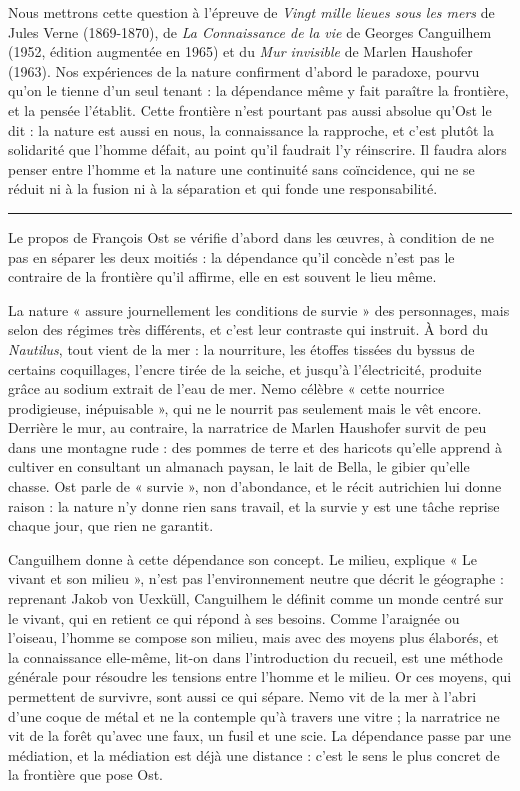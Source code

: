 \documentclass[11pt,a4paper]{article}
\begin{document}
Nous mettrons cette question à l'épreuve de \emph{Vingt mille lieues sous les mers} de Jules Verne (1869-1870), de \emph{La Connaissance de la vie} de Georges Canguilhem (1952, édition augmentée en 1965) et du \emph{Mur invisible} de Marlen Haushofer (1963). Nos expériences de la nature confirment d'abord le paradoxe, pourvu qu'on le tienne d'un seul tenant : la dépendance même y fait paraître la frontière, et la pensée l'établit. Cette frontière n'est pourtant pas aussi absolue qu'Ost le dit : la nature est aussi en nous, la connaissance la rapproche, et c'est plutôt la solidarité que l'homme défait, au point qu'il faudrait l'y réinscrire. Il faudra alors penser entre l'homme et la nature une continuité sans coïncidence, qui ne se réduit ni à la fusion ni à la séparation et qui fonde une responsabilité.

\begin{center}\rule{0.5\linewidth}{0.5pt}\end{center}

Le propos de François Ost se vérifie d'abord dans les œuvres, à condition de ne pas en séparer les deux moitiés : la dépendance qu'il concède n'est pas le contraire de la frontière qu'il affirme, elle en est souvent le lieu même.

La nature « assure journellement les conditions de survie » des personnages, mais selon des régimes très différents, et c'est leur contraste qui instruit. À bord du \emph{Nautilus}, tout vient de la mer : la nourriture, les étoffes tissées du byssus de certains coquillages, l'encre tirée de la seiche, et jusqu'à l'électricité, produite grâce au sodium extrait de l'eau de mer. Nemo célèbre « cette nourrice prodigieuse, inépuisable », qui ne le nourrit pas seulement mais le vêt encore. Derrière le mur, au contraire, la narratrice de Marlen Haushofer survit de peu dans une montagne rude : des pommes de terre et des haricots qu'elle apprend à cultiver en consultant un almanach paysan, le lait de Bella, le gibier qu'elle chasse. Ost parle de « survie », non d'abondance, et le récit autrichien lui donne raison : la nature n'y donne rien sans travail, et la survie y est une tâche reprise chaque jour, que rien ne garantit.

Canguilhem donne à cette dépendance son concept. Le milieu, explique « Le vivant et son milieu », n'est pas l'environnement neutre que décrit le géographe : reprenant Jakob von Uexküll, Canguilhem le définit comme un monde centré sur le vivant, qui en retient ce qui répond à ses besoins. Comme l'araignée ou l'oiseau, l'homme se compose son milieu, mais avec des moyens plus élaborés, et la connaissance elle-même, lit-on dans l'introduction du recueil, est une méthode générale pour résoudre les tensions entre l'homme et le milieu. Or ces moyens, qui permettent de survivre, sont aussi ce qui sépare. Nemo vit de la mer à l'abri d'une coque de métal et ne la contemple qu'à travers une vitre ; la narratrice ne vit de la forêt qu'avec une faux, un fusil et une scie. La dépendance passe par une médiation, et la médiation est déjà une distance : c'est le sens le plus concret de la frontière que pose Ost.
\end{document}
